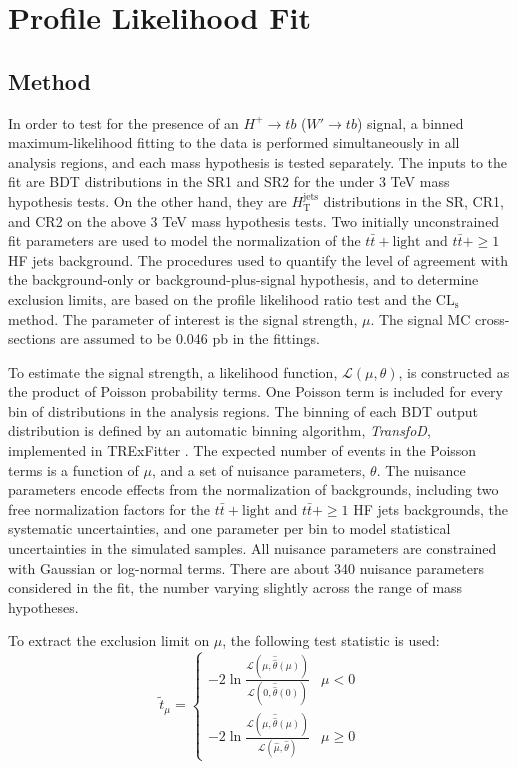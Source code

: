 \section{Profile Likelihood Fit} 
\label{sec:ProfileLikelohoodFit}

\subsection{Method}
\label{subsec:FitMethod}
In order to test for the presence of an $H^{+}{\rightarrow}tb$ ($W'{\rightarrow}tb$) signal, a binned maximum-likelihood fitting to the data is performed simultaneously in all analysis regions, and each mass hypothesis is tested separately. The inputs to the fit are BDT distributions in the SR1 and SR2 for the under 3 TeV mass hypothesis tests. On the other hand, they are $H_\text{T}^{\text{jets}}$ distributions in the SR, CR1, and CR2 on the above 3 TeV mass hypothesis tests. Two initially unconstrained fit parameters are used to model the normalization of the $t\bar{t}+\text{light}$ and $t\bar{t}+\geq 1$ HF jets background. The procedures used to quantify the level of agreement with the background-only or background-plus-signal hypothesis, and to determine exclusion limits, are based on the profile likelihood ratio test and the $\text{CL}_{\text{s}}$ method. The parameter of interest is the signal strength, $\mu$. The signal MC cross-sections are assumed to be 0.046 pb in the fittings.

To estimate the signal strength, a likelihood function, $\mathcal{L}({\mu},{\theta})$, is constructed as the product of Poisson probability terms. One Poisson term is included for every bin of distributions in the analysis regions. The binning of each BDT output distribution is defined by an automatic binning algorithm, \textit{TransfoD}, implemented in TRExFitter \cite{Binning-TTHFilter}. The expected number of events in the Poisson terms is a function of $\mu$, and a set of nuisance parameters, ${\theta}$. The nuisance parameters encode effects from the normalization of backgrounds, including two free normalization factors for the $t\bar{t}+\text{light}$ and $t\bar{t}+\geq 1$ HF jets backgrounds, the systematic uncertainties, and one parameter per bin to model statistical uncertainties in the simulated samples. All nuisance parameters are constrained with Gaussian or log-normal terms. There are about 340 nuisance parameters considered in the fit, the number varying slightly across the range of mass hypotheses.

To extract the exclusion limit on ${\mu}$, the following test statistic is used:
\begin{equation}
  \tilde{t}_{\mu} =
  \begin{cases}
    -2\ln{\frac{\mathcal{L}(\mu, \hat{\hat{\theta}}(\mu))}{\mathcal{L}(0, \hat{\hat{\theta}}(0))}} & {\mu}<0\\
    -2\ln{\frac{\mathcal{L}(\mu, \hat{\hat{\theta}}(\mu))}{\mathcal{L}(\hat{\mu}, \hat{\theta})}}  & {\mu}{\geq}0
  \end{cases}
\end{equation}

